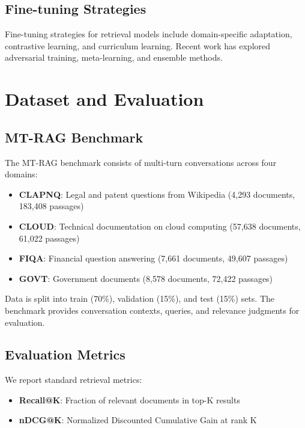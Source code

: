 \documentclass[11pt]{article}
\begin{document}
\subsection{Fine-tuning Strategies}

Fine-tuning strategies for retrieval models include domain-specific adaptation, contrastive learning, and curriculum learning. Recent work has explored adversarial training, meta-learning, and ensemble methods.

\section{Dataset and Evaluation}

\subsection{MT-RAG Benchmark}

The MT-RAG benchmark consists of multi-turn conversations across four domains:

\begin{itemize}
    \item \textbf{CLAPNQ}: Legal and patent questions from Wikipedia (4,293 documents, 183,408 passages)
    \item \textbf{CLOUD}: Technical documentation on cloud computing (57,638 documents, 61,022 passages)
    \item \textbf{FIQA}: Financial question answering (7,661 documents, 49,607 passages)
    \item \textbf{GOVT}: Government documents (8,578 documents, 72,422 passages)
\end{itemize}

Data is split into train (70\%), validation (15\%), and test (15\%) sets. The benchmark provides conversation contexts, queries, and relevance judgments for evaluation.

\subsection{Evaluation Metrics}

We report standard retrieval metrics:
\begin{itemize}
    \item \textbf{Recall@K}: Fraction of relevant documents in top-K results
    \item \textbf{nDCG@K}: Normalized Discounted Cumulative Gain at rank K
\end{itemize}
\end{document}
